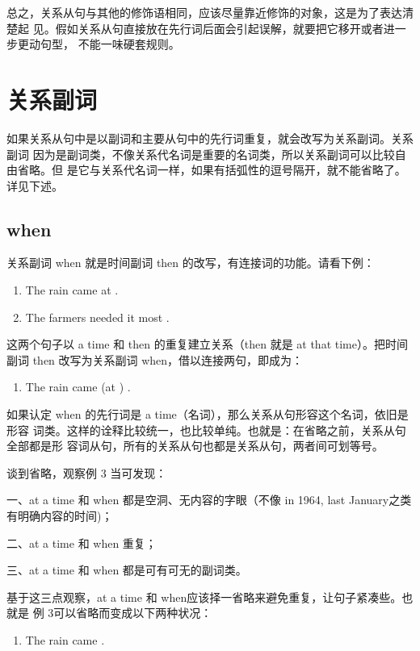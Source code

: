 总之，关系从句与其他的修饰语相同，应该尽量靠近修饰的对象，这是为了表达清楚起
见。假如关系从句直接放在先行词后面会引起误解，就要把它移开或者进一步更动句型，
不能一味硬套规则。

\section{关系副词}

如果关系从句中是以副词和主要从句中的先行词重复，就会改写为关系副词。关系副词
因为是副词类，不像关系代名词是重要的名词类，所以关系副词可以比较自由省略。但
是它与关系代名词一样，如果有括弧性的逗号隔开，就不能省略了。详见下述。

\subsection{when}

关系副词 when 就是时间副词 then 的改写，有连接词的功能。请看下例：

\begin{enumerate}
\item The rain came at .
\item The farmers needed it most .
\end{enumerate}
这两个句子以 a time 和 then 的重复建立关系（then 就是 at that time）。把时间
副词 then 改写为关系副词 when，借以连接两句，即成为：

\begin{enumerate}[resume]
\item The rain came (at ) .
\end{enumerate}
如果认定 when 的先行词是 a time（名词），那么关系从句形容这个名词，依旧是形容
词类。这样的诠释比较统一，也比较单纯。也就是：在省略之前，关系从句全部都是形
容词从句，所有的关系从句也都是关系从句，两者间可划等号。

谈到省略，观察例 3 当可发现：

一、at a time 和 when 都是空洞、无内容的字眼（不像 in 1964, last January之类
有明确内容的时间)；

二、at a time 和 when 重复；

三、at a time 和 when 都是可有可无的副词类。

基于这三点观察，at a time 和 when应该择一省略来避免重复，让句子紧凑些。也就是
例 3可以省略而变成以下两种状况：

\begin{enumerate}[resume]
\item The rain came .
\end{enumerate}

